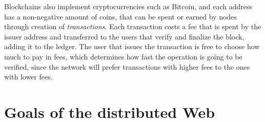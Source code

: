 \documentclass[mscthesis]{usiinfthesis}
\begin{document}
Blockchains also implement cryptocurrencies such as Bitcoin, and each address has a non-negative amount of coins, that can be spent or earned by nodes through creation of \emph{transactions}. Each transaction costs a fee that is spent by the issuer address and transferred to the users that verify and finalize the block, adding it to the ledger. The user that issues the transaction is free to choose how much to pay in fees, which determines how fast the operation is going to be verified, since the network will prefer transactions with higher fees to the ones with lower fees.

\section{Goals of the distributed Web}\label{sec:goals}
\end{document}
